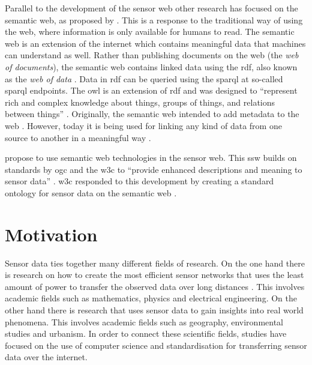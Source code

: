 Parallel to the development of the sensor web other research has focused on the semantic web, as proposed by \cite{LD:Berners-lee}. This is a response to the traditional way of using the web, where information is only available for humans to read. The semantic web is an extension of the internet which contains meaningful data that machines can understand as well. Rather than publishing documents on the web (the \textit{web of documents}), the semantic web contains linked data using the \ac{rdf}, also known as the \textit{web of data} \citep{LD:Bizer}. Data in \ac{rdf} can be queried using the \ac{sparql} at so-called \ac{sparql} endpoints. The \ac{owl} is an extension of \ac{rdf} and was designed to \enquote{represent rich and complex knowledge about things, groups of things, and relations between things} \citep{LD:OWL}. Originally, the semantic web intended to add metadata to the web \citep{LD:W3C}. However, today it is being used for linking any kind of data from one source to another in a meaningful way \citep{LD:Cambridge}. 

\cite{SSW:Sheth} propose to use semantic web technologies in the sensor web. This \ac{ssw} builds on standards by \ac{ogc} and the \ac{w3c} to \enquote{provide enhanced descriptions and meaning to sensor data} \cite[p. 78]{SSW:Sheth}. \ac{w3c} responded to this development by creating a standard ontology for sensor data on the semantic web \citep{SSW:SSN_incubatorGroup}. 


\section{Motivation}
Sensor data ties together many different fields of research. On the one hand there is research on how to create the most efficient sensor networks that uses the least amount of power to transfer the observed data over long distances \citep{SW:Korteweg,SW:Xiang}. This involves academic fields such as mathematics, physics and electrical engineering. On the other hand there is research that uses sensor data to gain insights into real world phenomena. This involves academic fields such as geography, environmental studies and urbanism. In order to connect these scientific fields, studies have focused on the use of computer science and standardisation for transferring sensor data over the internet. 

